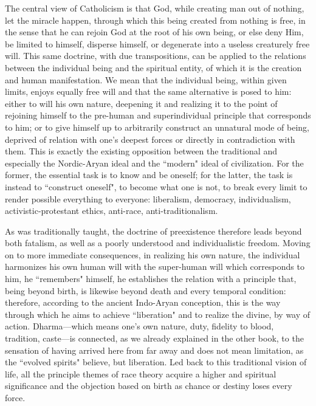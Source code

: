 The central view of Catholicism is that God, while creating man out of nothing, let the miracle happen, through which this being created from nothing is free, in the sense that he can rejoin God at the root of his own being, or else deny Him, be limited to himself, disperse himself, or degenerate into a useless creaturely free will. This same doctrine, with due transpositions, can be applied to the relations between the individual being and the spiritual entity, of which it is the creation and human manifestation. We mean that the individual being, within given limits, enjoys equally free will and that the same alternative is posed to him: either to will his own nature, deepening it and realizing it to the point of rejoining himself to the pre-human and superindividual principle that corresponds to him; or to give himself up to arbitrarily construct an unnatural mode of being, deprived of relation with one's deepest forces or directly in contradiction with them. This is exactly the existing opposition between the traditional and especially the Nordic-Aryan ideal and the ``modern" ideal of civilization. For the former, the essential task is to know and be oneself; for the latter, the task is instead to ``construct oneself", to become what one is not, to break every limit to render possible everything to everyone: liberalism, democracy, individualism, activistic-protestant ethics, anti-race, anti-traditionalism.

As was traditionally taught, the doctrine of preexistence therefore leads beyond both fatalism, as well as a poorly understood and individualistic freedom. Moving on to more immediate consequences, in realizing his own nature, the individual harmonizes his own human will with the super-human will which corresponds to him, he ``remembers" himself, he establishes the relation with a principle that, being beyond birth, is likewise beyond death and every temporal condition: therefore, according to the ancient Indo-Aryan conception, this is the way through which he aims to achieve ``liberation" and to realize the divine, by way of action. Dharma—which means one's own nature, duty, fidelity to blood, tradition, caste—is connected, as we already explained in the other book, to the sensation of having arrived here from far away and does not mean limitation, as the ``evolved spirits" believe, but liberation. Led back to this traditional vision of life, all the principle themes of race theory acquire a higher and spiritual significance and the objection based on birth as chance or destiny loses every force.

